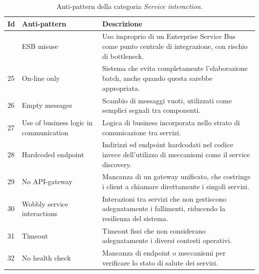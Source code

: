\begin{table}[H]
\centering
\caption{Anti-pattern della categoria \textit{Service interaction}.}
\label{tab:service_interaction}
\small
\renewcommand{\arraystretch}{1.15}
\setlength{\tabcolsep}{7pt}

\begin{tabularx}{\textwidth}{
>{\centering\arraybackslash}p{0.8cm}
>{\RaggedRight\arraybackslash}p{3.8cm}
>{\RaggedRight\arraybackslash}X
}
\toprule
\textbf{Id} & \textbf{Anti-pattern} & \textbf{Descrizione} \\
\midrule

24 & ESB misuse
& Uso improprio di un Enterprise Service Bus come punto centrale di integrazione, con rischio di bottleneck. \\

\addlinespace[0.3em]

25 & On-line only
& Sistema che evita completamente l’elaborazione batch, anche quando questa sarebbe appropriata. \\

\addlinespace[0.3em]

26 & Empty messages
& Scambio di messaggi vuoti, utilizzati come semplici segnali tra componenti. \\

\addlinespace[0.3em]

27 & Use of business logic in communication
& Logica di business incorporata nello strato di comunicazione tra servizi. \\

\addlinespace[0.3em]

28 & Hardcoded endpoint
& Indirizzi ed endpoint hardcodati nel codice invece dell’utilizzo di meccanismi come il service discovery. \\

\addlinespace[0.3em]

29 & No API-gateway
& Mancanza di un gateway unificato, che costringe i client a chiamare direttamente i singoli servizi. \\

\addlinespace[0.3em]

30 & Wobbly service interactions
& Interazioni tra servizi che non gestiscono adeguatamente i fallimenti, riducendo la resilienza del sistema. \\

\addlinespace[0.3em]

31 & Timeout
& Timeout fissi che non considerano adeguatamente i diversi contesti operativi. \\

\addlinespace[0.3em]

32 & No health check
& Mancanza di endpoint o meccanismi per verificare lo stato di salute dei servizi. \\

\bottomrule
\end{tabularx}
\end{table}
\normalsize

